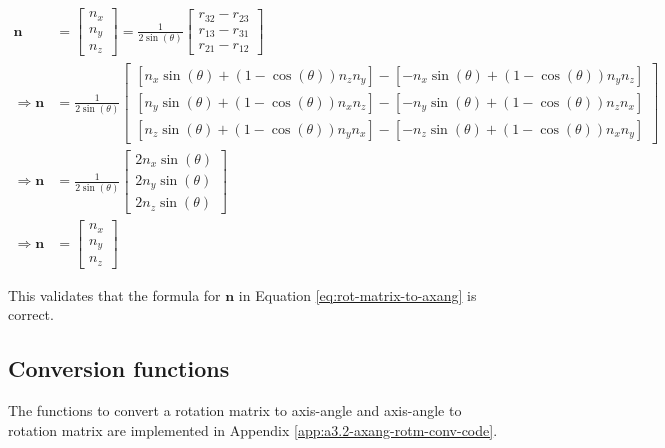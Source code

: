 \begin{equation}
    \begin{split}
        \mathbf{n} &= \begin{bmatrix}
            n_x \\ n_y \\ n_z
            \end{bmatrix} = \frac{1}{2\sin(\theta)} \begin{bmatrix}
            r_{32} - r_{23} \\
            r_{13} - r_{31} \\
            r_{21} - r_{12}
            \end{bmatrix} \\
        \Rightarrow \mathbf{n} &= \frac{1}{2\sin(\theta)} \begin{bmatrix}
            \left [ n_x \sin(\theta) + (1-\cos(\theta)) n_z n_y \right ] - \left [ -n_x \sin(\theta) + (1-\cos(\theta)) n_y n_z \right ] \\
            \left [ n_y \sin(\theta) + (1-\cos(\theta)) n_x n_z \right ] - \left [ -n_y \sin(\theta) + (1-\cos(\theta)) n_z n_x \right ]\\
            \left [ n_z \sin(\theta) + (1-\cos(\theta)) n_y n_x \right ] - \left [ -n_z \sin(\theta) + (1-\cos(\theta)) n_x n_y \right ]
            \end{bmatrix} \\
        \Rightarrow \mathbf{n} &= \frac{1}{2\sin(\theta)} \begin{bmatrix}
            2 n_x \sin(\theta) \\
            2 n_y \sin(\theta) \\
            2 n_z \sin(\theta)
            \end{bmatrix} \\
        \Rightarrow \mathbf{n} &= \begin{bmatrix}
            n_x \\ n_y \\ n_z
            \end{bmatrix}
    \end{split}
\end{equation}

This validates that the formula for $\mathbf{n}$ in Equation \ref{eq:rot-matrix-to-axang} is correct.

\subsection[A3.2: Conversion functions]{Conversion functions}

The functions to convert a rotation matrix to axis-angle and axis-angle to rotation matrix are implemented in Appendix \ref{app:a3.2-axang-rotm-conv-code}.
